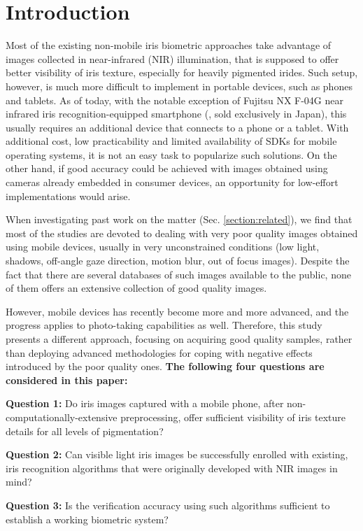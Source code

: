 \documentclass[10pt,twocolumn,letterpaper]{article}
\begin{document}
\section{Introduction}
Most of the existing non-mobile iris biometric approaches take advantage of images collected in near-infrared (NIR) illumination, that is supposed to offer better visibility of iris texture, especially for heavily pigmented irides. Such setup, however, is much more difficult to implement in portable devices, such as phones and tablets. As of today, with the notable exception of Fujitsu NX F-04G near infrared iris recognition-equipped smartphone (\cite{fujitsuIrisPhone}, sold exclusively in Japan), this usually requires an additional device that connects to a phone or a tablet. With additional cost, low practicability and limited availability of SDKs for mobile operating systems, it is not an easy task to popularize such solutions. On the other hand, if good accuracy could be achieved with images obtained using cameras already embedded in consumer devices, an opportunity for low-effort implementations would arise. 

When investigating past work on the matter (Sec. \ref{section:related}), we find that most of the studies are devoted to dealing with very poor quality images obtained using mobile devices, usually in very unconstrained conditions (low light, shadows, off-angle gaze direction, motion blur, out of focus images). Despite the fact that there are several databases of such images available to the public, none of them offers an extensive collection of good quality images.

However, mobile devices has recently become more and more advanced, and the progress applies to photo-taking capabilities as well. Therefore, this study presents a different approach, focusing on acquiring good quality samples, rather than deploying advanced methodologies for coping with negative effects introduced by the poor quality ones. \textbf{The following four questions are considered in this paper:}

\textbf{Question 1:} Do iris images captured with a mobile phone, after non-computationally-extensive preprocessing, offer sufficient visibility of iris texture details for all levels of pigmentation?

\textbf{Question 2:} Can visible light iris images be successfully enrolled with existing, iris recognition algorithms that were originally developed with NIR images in mind?

\textbf{Question 3:} Is the verification accuracy using such algorithms sufficient to establish a working biometric system?
\end{document}
